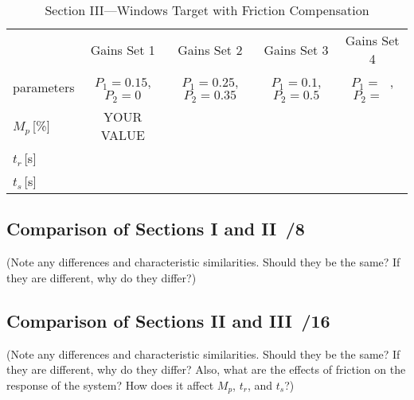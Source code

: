 \documentclass{article}
\newcommand{\score}{\hfill \underline{\hspace{0.65cm}}\,/} %
\begin{document}
\begin{table}[phtb]\footnotesize 
\begin{center}
\caption{Section III---Windows Target with Friction Compensation}
\label{tbl:lab5_q1_4}
\begin{tabular}{l|m{1.2cm}|m{1.2cm}|m{1.2cm}|m{1.2cm}|m{1.2cm}|m{1.2cm}|m{1.2cm}|m{1.2cm}} \hline \hline
\cellcolor{lightgray} & \multicolumn{2}{c|}{\cellcolor{lightgray}Gains Set 1} & \multicolumn{2}{c|}{\cellcolor{lightgray}Gains Set 2} & \multicolumn{2}{c|}{\cellcolor{lightgray}Gains Set 3} & \multicolumn{2}{c}{\cellcolor{lightgray}Gains Set 4}\\ \cline{2-9}
\multirow{-2}{*}{\cellcolor{lightgray}parameters}& \multicolumn{2}{c|}{$P_1 = 0.15$, $P_2 = 0$}& \multicolumn{2}{c|}{$P_1 = 0.25$, $P_2 = 0.35$}& \multicolumn{2}{c|}{$P_1 = 0.1$, $P_2 = 0.5$}& \multicolumn{2}{c}{$P_1 = ~~~$, $P_2 = ~~~$}\\ \hline
$M_p$\,[\%]& \multicolumn{2}{c|}{YOUR VALUE} & \multicolumn{2}{c|}{~} & \multicolumn{2}{c|}{~} & \multicolumn{2}{c}{~} \\ \hline
$t_r$\,[\si{\second}] & \multicolumn{2}{c|}{} & \multicolumn{2}{c|}{} & \multicolumn{2}{c|}{} & \multicolumn{2}{c}{} \\ \hline
$t_s$\,[\si{\second}] & \multicolumn{2}{c|}{} & \multicolumn{2}{c|}{} & \multicolumn{2}{c|}{} & \multicolumn{2}{c}{} \\ \hline
\end{tabular}
\end{center}
\end{table}


\subsection{Comparison of Sections I and II \score 8}
(Note any differences and characteristic similarities. Should they be the same? If they are different, why do they differ?)


\subsection{Comparison of Sections II and III \score 16}
(Note any differences and characteristic similarities. Should they be the same? If they
are different, why do they differ? Also, what are the effects of friction on the response of
the system? How does it affect $M_p$, $t_r$, and $t_s$?)
\end{document}

